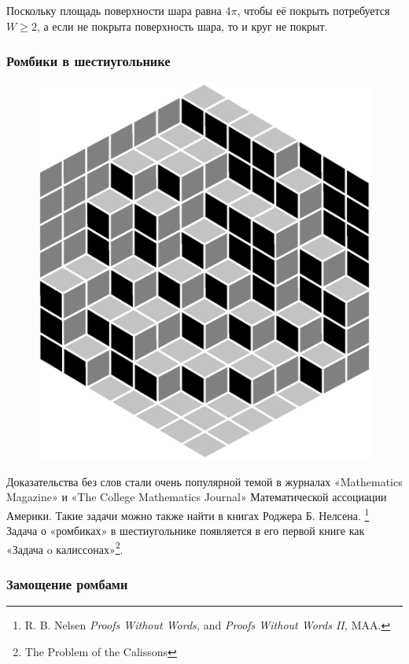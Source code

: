 Поскольку площадь поверхности шара равна $4\pi$, чтобы её покрыть потребуется $W\ge 2$,
а если не покрыта поверхность шара, то и круг не покрыт.

\subsubsection*{Ромбики в шестиугольнике}%

\begin{figure}[h!]
\centering
\includegraphics[scale=0.5]{Figs/Geometry/diamonds}
\end{figure}
\heart

Доказательства без слов стали очень популярной темой в журналах «Mathematics Magazine» и «The College Mathematics Journal» Математической ассоциации Америки.
Такие задачи можно также найти в книгах Роджера Б. Нелсена.%
\footnote{R. B. Nelsen \emph{Proofs Without Words,} and \emph{Proofs Without Words II,} MAA.}
Задача о «ромбиках» в шестиугольнике появляется в его первой книге как «Задача o калиссонах»\footnote{The Problem of the Calissons}.

\subsubsection*{Замощение ромбами}%

